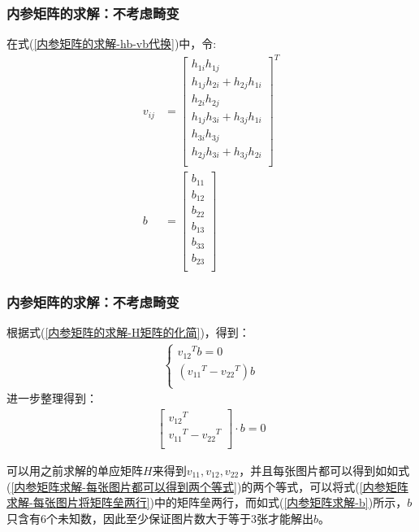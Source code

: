 \documentclass[aspectratio=43]{beamer}
\begin{document}
	\begin{frame}
		\frametitle{内参矩阵的求解：不考虑畸变}
		在式(\ref{内参矩阵的求解-hb-vb代换})中，令:\\
		\begin{align}
			v_{ij}&=\left[ \begin{array}{c}
				h_{1i}h_{1j}\\
				h_{1j}h_{2i}+h_{2j}h_{1i}\\
				h_{2i}h_{2j}\\
				h_{1j}h_{3i}+h_{3j}h_{1i}\\
				h_{3i}h_{3j}\\
				h_{2j}h_{3i}+h_{3j}h_{2i}\\
			\end{array} \right] ^T
			\\
			b&=\left[ \begin{array}{c}
				b_{11}\\
				b_{12}\\
				b_{22}\\
				b_{13}\\
				b_{33}\\
				b_{23}\\
			\end{array} \right] \label{内参矩阵求解-b}
		\end{align}
	\end{frame}	
	
	
	\begin{frame}
		\frametitle{内参矩阵的求解：不考虑畸变}
		根据式(\ref{内参矩阵的求解-H矩阵的化简})，得到：\\
		\begin{align}
			\begin{cases}\label{内参矩阵求解-每张图片都可以得到两个等式}
				{v_{12}}^Tb=0\\
				\left( {v_{11}}^T-{v_{22}}^T \right) b\\
			\end{cases}
		\end{align}进一步整理得到：
		\begin{align}\label{内参矩阵求解-每张图片将矩阵垒两行}
			\left[ \begin{array}{c}
				{v_{12}}^T\\
				{v_{11}}^T-{v_{22}}^T\\
			\end{array} \right] \cdot b=0
		\end{align}
		\begin{shaded}
			\quad 可以用之前求解的单应矩阵$H$来得到$v_{11},v_{12},v_{22}$，并且每张图片都可以得到如如式(\ref{内参矩阵求解-每张图片都可以得到两个等式})的两个等式，可以将式(\ref{内参矩阵求解-每张图片将矩阵垒两行})中的矩阵垒两行，而如式(\ref{内参矩阵求解-b})所示，$b$只含有6个未知数，因此至少保证图片数大于等于3张才能解出$b$。
		\end{shaded}
	\end{frame}	
	
\end{document}
